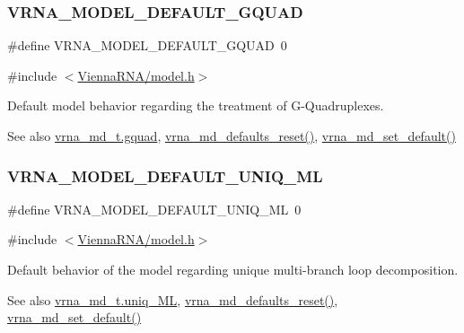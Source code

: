 \subsubsection{\texorpdfstring{VRNA\_MODEL\_DEFAULT\_GQUAD}{VRNA\_MODEL\_DEFAULT\_GQUAD}}
{\footnotesize\ttfamily \#define V\+R\+N\+A\+\_\+\+M\+O\+D\+E\+L\+\_\+\+D\+E\+F\+A\+U\+L\+T\+\_\+\+G\+Q\+U\+AD~0}



{\ttfamily \#include $<$\mbox{\hyperlink{model_8h}{Vienna\+R\+N\+A/model.\+h}}$>$}



Default model behavior regarding the treatment of G-\/\+Quadruplexes. 

\begin{DoxySeeAlso}{See also}
\mbox{\hyperlink{group__model__details_af88a511a2b1f526b4c6213de6cb8fd6e}{vrna\+\_\+md\+\_\+t.\+gquad}}, \mbox{\hyperlink{group__model__details_ga70834424cf804d149937de89f80ceb45}{vrna\+\_\+md\+\_\+defaults\+\_\+reset()}}, \mbox{\hyperlink{group__model__details_ga8ac6ff84936282436f822644bf841f66}{vrna\+\_\+md\+\_\+set\+\_\+default()}} 
\end{DoxySeeAlso}
\mbox{\label{group__model__details_ga63f6006a02ba2d89148441f406c309e7}} 
\subsubsection{\texorpdfstring{VRNA\_MODEL\_DEFAULT\_UNIQ\_ML}{VRNA\_MODEL\_DEFAULT\_UNIQ\_ML}}
{\footnotesize\ttfamily \#define V\+R\+N\+A\+\_\+\+M\+O\+D\+E\+L\+\_\+\+D\+E\+F\+A\+U\+L\+T\+\_\+\+U\+N\+I\+Q\+\_\+\+ML~0}



{\ttfamily \#include $<$\mbox{\hyperlink{model_8h}{Vienna\+R\+N\+A/model.\+h}}$>$}



Default behavior of the model regarding unique multi-\/branch loop decomposition. 

\begin{DoxySeeAlso}{See also}
\mbox{\hyperlink{group__model__details_ade065b814a4e2e72ead93ab502613ed2}{vrna\+\_\+md\+\_\+t.\+uniq\+\_\+\+ML}}, \mbox{\hyperlink{group__model__details_ga70834424cf804d149937de89f80ceb45}{vrna\+\_\+md\+\_\+defaults\+\_\+reset()}}, \mbox{\hyperlink{group__model__details_ga8ac6ff84936282436f822644bf841f66}{vrna\+\_\+md\+\_\+set\+\_\+default()}} 
\end{DoxySeeAlso}
\mbox{\label{group__model__details_ga6fcf6b2d0f89256cdbd166486c9b6e1e}} 
